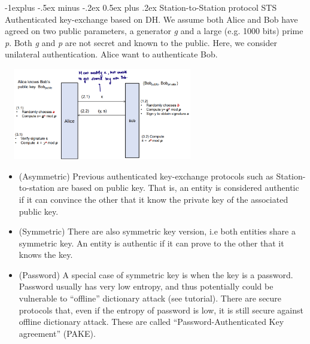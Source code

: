 \documentclass[10pt,landscape]{article}
\makeatletter
\renewcommand{\subsection}{\@startsection{subsection}{2}{0mm}%
                                {-1explus -.5ex minus -.2ex}%
                                {0.5ex plus .2ex}%
                                {\normalfont\normalsize\bfseries}}
\makeatother
\begin{document}
\begin{multicols*}{3}
\subsection{Station-to-Station protocol STS}
Authenticated key-exchange based on DH. We assume both Alice and Bob have agreed on two public parameters, a generator \textit{g} and a
large (e.g. 1000 bits) prime \textit{p}. Both \textit{g} and \textit{p} are not secret and known to the public.
Here, we consider unilateral authentication. Alice want to authenticate Bob.

\includegraphics[width=8.6cm, height=4cm]{images/stsprotocol.png} 

\begin{itemize}[noitemsep,wide=0pt, leftmargin=\dimexpr{} + 2\relax]
    \item (Asymmetric) Previous authenticated key-exchange protocols such as Station-to-station are
    based on public key. That is, an entity is considered authentic if it can convince the other
    that it know the private key of the associated public key.
    \item (Symmetric) There are also symmetric key version, i.e both entities share a symmetric key.
    An entity is authentic if it can prove to the other that it knows the key. 
    \item (Password) A special case of symmetric key is when the key is a password. Password
    usually has very low entropy, and thus potentially could be vulnerable to “offline”
    dictionary attack (see tutorial). There are secure protocols that, even if the entropy of
    password is low, it is still secure against offline dictionary attack. These are called “Password-Authenticated Key
    agreement” (PAKE). 
\end{itemize}


\end{multicols*}
\end{document}
